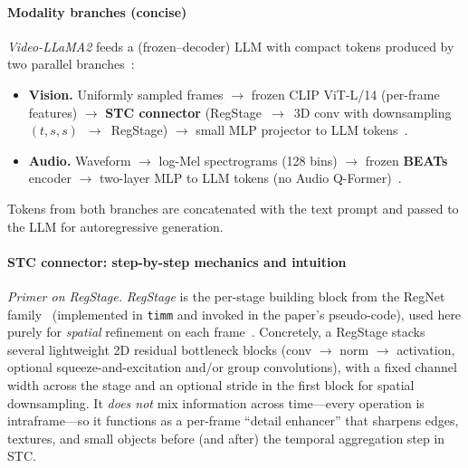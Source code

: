 \begin{enrichment}
\begin{enrichment}
        \paragraph{Modality branches (concise)}
        \emph{Video\mbox{-}LLaMA2} feeds a (frozen–decoder) LLM with compact tokens produced by two parallel branches~\cite[Sec.~2]{cheng2024_videollama2}:
        \begin{itemize}
            \item \textbf{Vision.} Uniformly sampled frames $\rightarrow$ frozen CLIP ViT\mbox{-}L/14 (per\mbox{-}frame features) $\rightarrow$ \textbf{STC connector} (RegStage \,$\rightarrow$\, 3D conv with downsampling $(t,s,s)$ \,$\rightarrow$\, RegStage) $\rightarrow$ small MLP projector to LLM tokens~\cite[Sec.~2.1]{cheng2024_videollama2}.
            \item \textbf{Audio.} Waveform $\rightarrow$ log\mbox{-}Mel spectrograms (128 bins) $\rightarrow$ frozen \textbf{BEATs} encoder $\rightarrow$ two\mbox{-}layer MLP to LLM tokens (no Audio Q\mbox{-}Former)~\cite[Sec.~2.2]{cheng2024_videollama2}.
        \end{itemize}
        Tokens from both branches are concatenated with the text prompt and passed to the LLM for autoregressive generation.
        
        \newpage
        
        \paragraph{STC connector: step\mbox{-}by\mbox{-}step mechanics and intuition}
        \textit{Primer on RegStage.} \emph{RegStage} is the per\mbox{-}stage building block from the RegNet family~\cite{radosavovic2020_dnds} (implemented in \texttt{timm} and invoked in the paper’s pseudo\mbox{-}code), used here purely for \emph{spatial} refinement on each frame~\cite[Alg.\,1; Sec.\,2.1]{cheng2024_videollama2}. Concretely, a RegStage stacks several lightweight 2D residual bottleneck blocks (conv $\rightarrow$ norm $\rightarrow$ activation, optional squeeze\mbox{-}and\mbox{-}excitation and/or group convolutions), with a fixed channel width across the stage and an optional stride in the first block for spatial downsampling. It \emph{does not} mix information across time—every operation is intraframe—so it functions as a per\mbox{-}frame “detail enhancer” that sharpens edges, textures, and small objects before (and after) the temporal aggregation step in STC.
        

\end{enrichment}
\end{enrichment}
